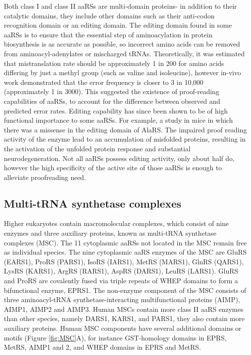 Both class I and class II aaRSs are multi-domain proteins- in addition to their catalytic domains, they include other domains such as their anti-codon recognition domain or an editing domain.
The editing domain found in some aaRSs is to ensure that the essential step of aminoacylation in protein biosynthesis is as accurate as possible, so incorrect amino acids can be removed from aminoacyl-adenylates or mischarged tRNAs\cite{kwon2019aminoacyl}.
Theoretically, it was estimated that mistranslation rate should be approximately 1 in 200 for amino acids differing by just a methyl group (such as valine and isoleucine)\cite{pauling1958festschrift}, however in-vivo work demonstrated that the error frequency is closer to 3 in 10,000 (approximately 1 in 3000)\cite{loftfield1972frequency}.
This suggested the existence of proof-reading capabilities of aaRSs, to account for the difference between observed and predicted error rates.
Editing capability has since been shown to be of high functional importance to some aaRSs.
For example, a study in mice in which there was a missense in the editing domain of AlaRS.
The impaired proof reading activity of the enzyme lead to an accumulation of misfolded proteins, resulting in the activation of the unfolded protein response and substantial neurodegeneration\cite{lee2006editing}.
Not all aaRSs possess editing activity, only about half do, however the high specificity of the active site of those aaRSs is enough to alleviate proofreading need.

\subsection{Multi-tRNA synthetase complexes}
Higher eukaryotes contain macromolecular complexes, which consist of nine enzymes and three auxiliary proteins, known as multi-tRNA synthetase complexes (MSC).
The 11 cytoplasmic aaRSs not located in the MSC remain free as individual species.
The nine cytoplasmic aaRS enzymes of the MSC are GluRS (EARS1), ProRS (PARS1), IsoRS (IARS1), MetRS (MARS1), GlnRS (QARS1), LysRS (KARS1), ArgRS (RARS1), AspRS (DARS1), LeuRS (LARS1).
GluRS and ProRS are covalently fused via triple repeats of WHEP domains to form a bifunctional enzyme, EPRS1.
The non-enzyme component of the MSC consists of three aminoacyl-tRNA synthetase-interacting multifunctional proteins (AIMP), AIMP1, AIMP2 and AIMP3.
Human MSCs contain more class II aaRS enzymes than other species, namely DARS1, KARS1, and PARS1, they also contain more auxiliary proteins.
Human MSC components have several additional domains or motifs (Figure \ref{fig:MSC}A), for instance GST-homology domains in EPRS, MetRS, AIMP1 and 2, and WHEP domains in EPRS and MetRS\cite{kim2019evolution, khan20203, kim2020structures}.

